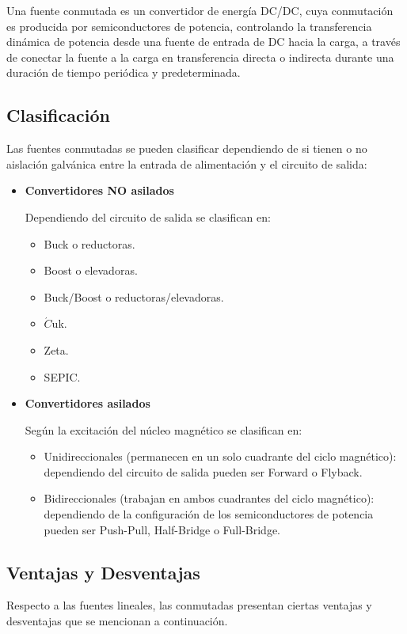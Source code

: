 \documentclass[11pt, a4paper]{article}
\begin{document}
Una fuente conmutada es un convertidor de energía DC/DC, cuya conmutación es producida por semiconductores de potencia, controlando la transferencia dinámica de potencia desde una fuente de entrada de DC hacia la carga, a través de conectar la fuente a la carga en transferencia directa o indirecta durante una duración de tiempo periódica y predeterminada.

\subsection{Clasificación}
Las fuentes conmutadas se pueden clasificar dependiendo de si tienen o no aislación galvánica entre la entrada de alimentación y el circuito de salida:
\begin{itemize} 
	\item \textbf{Convertidores NO asilados}
	
	Dependiendo del circuito de salida se clasifican en:
		\begin{itemize}
			\item Buck o reductoras.
			\item Boost o elevadoras.
			\item Buck/Boost o reductoras/elevadoras.
			\item $\acute{C}$uk.
			\item Zeta.
			\item SEPIC.
		\end{itemize}
	\item \textbf{Convertidores asilados}
	
	Según la excitación del núcleo magnético se clasifican en:
		\begin{itemize}
			\item Unidireccionales (permanecen en un solo cuadrante del ciclo magnético): dependiendo del circuito de salida pueden ser Forward o Flyback.
			\item Bidireccionales (trabajan en ambos cuadrantes del ciclo magnético): dependiendo de la configuración de los semiconductores de potencia pueden ser Push-Pull, Half-Bridge o Full-Bridge.
		\end{itemize}
\end{itemize}

\subsection{Ventajas y Desventajas}
Respecto a las fuentes lineales, las conmutadas presentan ciertas ventajas y desventajas que se mencionan a continuación.
\end{document}

